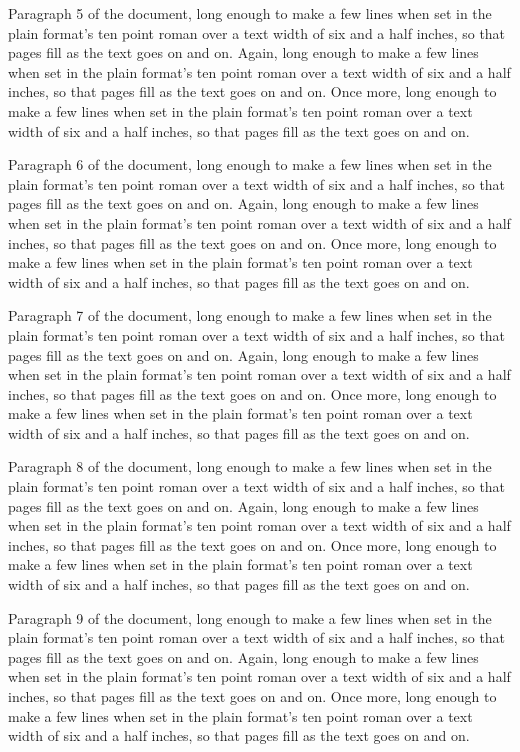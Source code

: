 Paragraph 5 of the document, long enough to make a few lines when set in the plain format's ten point roman over a text width of six and a half inches, so that pages fill as the text goes on and on. Again, long enough to make a few lines when set in the plain format's ten point roman over a text width of six and a half inches, so that pages fill as the text goes on and on. Once more, long enough to make a few lines when set in the plain format's ten point roman over a text width of six and a half inches, so that pages fill as the text goes on and on.

Paragraph 6 of the document, long enough to make a few lines when set in the plain format's ten point roman over a text width of six and a half inches, so that pages fill as the text goes on and on. Again, long enough to make a few lines when set in the plain format's ten point roman over a text width of six and a half inches, so that pages fill as the text goes on and on. Once more, long enough to make a few lines when set in the plain format's ten point roman over a text width of six and a half inches, so that pages fill as the text goes on and on.

Paragraph 7 of the document, long enough to make a few lines when set in the plain format's ten point roman over a text width of six and a half inches, so that pages fill as the text goes on and on. Again, long enough to make a few lines when set in the plain format's ten point roman over a text width of six and a half inches, so that pages fill as the text goes on and on. Once more, long enough to make a few lines when set in the plain format's ten point roman over a text width of six and a half inches, so that pages fill as the text goes on and on.

Paragraph 8 of the document, long enough to make a few lines when set in the plain format's ten point roman over a text width of six and a half inches, so that pages fill as the text goes on and on. Again, long enough to make a few lines when set in the plain format's ten point roman over a text width of six and a half inches, so that pages fill as the text goes on and on. Once more, long enough to make a few lines when set in the plain format's ten point roman over a text width of six and a half inches, so that pages fill as the text goes on and on.

Paragraph 9 of the document, long enough to make a few lines when set in the plain format's ten point roman over a text width of six and a half inches, so that pages fill as the text goes on and on. Again, long enough to make a few lines when set in the plain format's ten point roman over a text width of six and a half inches, so that pages fill as the text goes on and on. Once more, long enough to make a few lines when set in the plain format's ten point roman over a text width of six and a half inches, so that pages fill as the text goes on and on.

